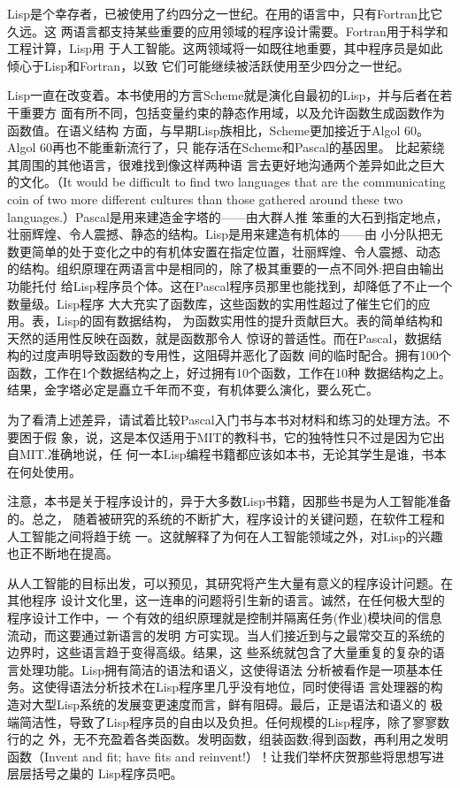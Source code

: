 \documentclass[11pt]{article}
\begin{document}
Lisp是个幸存者，已被使用了约四分之一世纪。在用的语言中，只有Fortran比它久远。这
两语言都支持某些重要的应用领域的程序设计需要。Fortran用于科学和工程计算，Lisp用
于人工智能。这两领域将一如既往地重要，其中程序员是如此倾心于Lisp和Fortran，以致
它们可能继续被活跃使用至少四分之一世纪。

Lisp一直在改变着。本书使用的方言Scheme就是演化自最初的Lisp，并与后者在若干重要方
面有所不同，包括变量约束的静态作用域，以及允许函数生成函数作为函数值。在语义结构
方面，与早期Lisp族相比，Scheme更加接近于Algol 60。Algol 60再也不能重新流行了，只
能存活在Scheme和Pascal的基因里。 比起萦绕其周围的其他语言，很难找到像这样两种语
言去更好地沟通两个差异如此之巨大的文化。（It would be difficult to find two
languages that are the communicating coin of two more different cultures than
those gathered around these two languages.）Pascal是用来建造金字塔的——由大群人推
笨重的大石到指定地点，壮丽辉煌、令人震撼、静态的结构。Lisp是用来建造有机体的——由
小分队把无数更简单的处于变化之中的有机体安置在指定位置，壮丽辉煌、令人震撼、动态
的结构。组织原理在两语言中是相同的，除了极其重要的一点不同外:把自由输出功能托付
给Lisp程序员个体。这在Pascal程序员那里也能找到，却降低了不止一个数量级。Lisp程序
大大充实了函数库，这些函数的实用性超过了催生它们的应用。表，Lisp的固有数据结构，
为函数实用性的提升贡献巨大。表的简单结构和天然的适用性反映在函数，就是函数那令人
惊讶的普适性。而在Pascal，数据结构的过度声明导致函数的专用性，这阻碍并恶化了函数
间的临时配合。拥有100个函数，工作在1个数据结构之上，好过拥有10个函数，工作在10种
数据结构之上。结果，金字塔必定是矗立千年而不变，有机体要么演化，要么死亡。

为了看清上述差异，请试着比较Pascal入门书与本书对材料和练习的处理方法。不要困于假
象，说，这是本仅适用于MIT的教科书，它的独特性只不过是因为它出自MIT.准确地说，任
何一本Lisp编程书籍都应该如本书，无论其学生是谁，书本在何处使用。

注意，本书是关于程序设计的，异于大多数Lisp书籍，因那些书是为人工智能准备的。总之，
随着被研究的系统的不断扩大，程序设计的关键问题，在软件工程和人工智能之间将趋于统
一。这就解释了为何在人工智能领域之外，对Lisp的兴趣也正不断地在提高。

从人工智能的目标出发，可以预见，其研究将产生大量有意义的程序设计问题。在其他程序
设计文化里，这一连串的问题将引生新的语言。诚然，在任何极大型的程序设计工作中，一
个有效的组织原理就是控制并隔离任务(作业)模块间的信息流动，而这要通过新语言的发明
方可实现。当人们接近到与之最常交互的系统的边界时，这些语言趋于变得高级。结果，这
些系统就包含了大量重复的复杂的语言处理功能。Lisp拥有简洁的语法和语义，这使得语法
分析被看作是一项基本任务。这使得语法分析技术在Lisp程序里几乎没有地位，同时使得语
言处理器的构造对大型Lisp系统的发展变更速度而言，鲜有阻碍。最后，正是语法和语义的
极端简洁性，导致了Lisp程序员的自由以及负担。任何规模的Lisp程序，除了寥寥数行的之
外，无不充盈着各类函数。发明函数，组装函数;得到函数，再利用之发明函数（Invent
and fit; have fits and reinvent!）！让我们举杯庆贺那些将思想写进层层括号之巢的
Lisp程序员吧。
\end{document}
